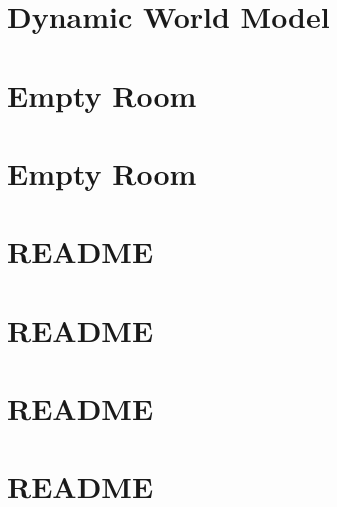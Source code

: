 \documentclass[twoside]{book}
\newcommand{\+}{\discretionary{\mbox{\scriptsize$\hookleftarrow$}}{}{}}
\begin{document}
\chapter{Dynamic World Model}
\label{md_smacc2_sm_reference_library_sm_dance_bot_warehouse_3_models_dynamic_world_README}

\chapter{Empty Room}
\label{md_smacc2_sm_reference_library_sm_dance_bot_warehouse_3_models_empty_room_copy_README}

\chapter{Empty Room}
\label{md_smacc2_sm_reference_library_sm_dance_bot_warehouse_3_models_empty_room_README}

\chapter{README}
\label{md_smacc2_sm_reference_library_sm_dance_bot_warehouse_3_README}

\chapter{README}
\label{md_smacc2_sm_reference_library_sm_ferrari_README}

\chapter{README}
\label{md_smacc2_sm_reference_library_sm_husky_barrel_search_1_README}

\chapter{README}
\label{md_smacc2_sm_reference_library_sm_multi_stage_1_README}

\end{document}
